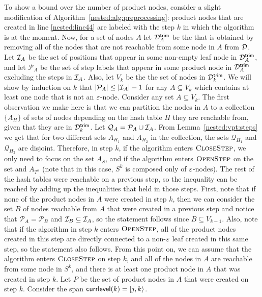 To show a bound over the number of product nodes, consider a slight modification of Algorithm~\ref{nested:alg:preprocessing}: 
product nodes that are created in line \ref{nested:line44} are labeled with the step $k$ in which the algorithm is at the moment. 
Now, for a set of nodes $A$ let $\mathcal{D}^{\textsf{trim}}_A$ be the \dsepsabbr that is obtained by removing all of the nodes that are not reachable from some node in $A$ from $\mathcal{D}$.
Let $\mathcal{I}_A$ be the set of positions that appear in some non-empty leaf node in $\mathcal{D}^{\textsf{trim}}_A$, and let ${\mathcal P}_A$ be the set of step labels that appear in some product node in $\mathcal{D}^{\textsf{trim}}_A$ excluding the steps in $\mathcal{I}_A$. Also, let $V_k$ be the the set of nodes in $\mathcal{D}^{\textsf{trim}}_k$. We will show by induction on $k$ that $| {\mathcal P}_A | \leq | \mathcal{I}_A | - 1$ for any $A\subseteq V_k$ which contains at least one node that is not an $\varepsilon$-node. Consider any set $A \subseteq V_k$. The first observation we make here is that we can partition the nodes in $A$ to a collection $\{A_H\}$ of sets of nodes depending on the hash table $H$ they are reachable from, given that they are in $\mathcal{D}^{\textsf{trim}}_k$. Let ${\mathcal Q}_A = {\mathcal P}_A \cup \mathcal{I}_A$. From Lemma~\ref{nested:vpt:steps} we get that for two different sets $A_{H_1}$ and $A_{H_2}$ in the collection, the sets ${\mathcal Q}_{H_1}$ and ${\mathcal Q}_{H_2}$ are disjoint. 
Therefore, in step $k$, if the algorithm enters $\textsc{CloseStep}$, we only need to focus on the set $A_{S}$, and if the algorithm enters $\textsc{OpenStep}$ on the set and $A_{T^k}$ (note that in this case, $S^k$ is composed only of $\varepsilon$-nodes). The rest of the hash tables were reachable  on a previous step, so the inequality can be reached by adding up the inequalities that held in those steps. 
First, note that if none of the product nodes in $A$ were created in step $k$, then we can consider the set $B$ of nodes reachable from $A$ that were created in a previous step and notice that ${\mathcal P}_A = {\mathcal P}_B$ and $\mathcal{I}_B \subseteq \mathcal{I}_A$, so the statement follows since $B \subseteq V_{k-1}$. 
Also, note that if the algorithm in step $k$ enters $\textsc{OpenStep}$, all of the product nodes created in this step are directly connected to a non-$\varepsilon$ leaf created in this same step, so the statement also follows. 
From this point on, we can assume that the algorithm enters $\textsc{CloseStep}$ on step $k$, and all of the nodes in $A$ are reachable from some node in $S^k$, and there is at least one product node in $A$ that was created in step $k$. Let $P$ be the set of product nodes in $A$ that were created on step $k$. Consider the span ${\sf currlevel}(k) = [j,k\rangle$. 
